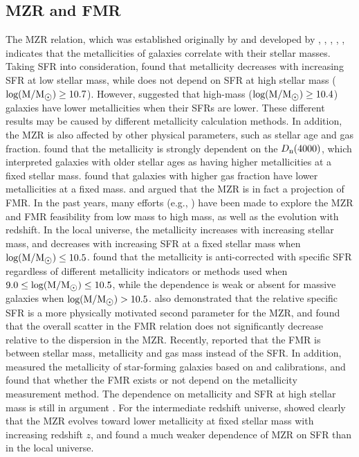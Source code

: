 \documentclass[usenatbib]{raa}
\begin{document}
\subsection{MZR and FMR}
The MZR relation, which was established originally by \cite{1979AA....80..155L} and developed by
\cite{1987ApJ...317...82G}, \cite{1989ApJ...347..875S}, 
\cite{1991ApJ...379..157B}, \cite{1994ApJ...420...87Z}, 
\cite{2004ApJ...613..898T},
 indicates that the metallicities of galaxies correlate with their stellar masses.
Taking SFR into consideration, \cite{2010MNRAS.408.2115M} found that
metallicity decreases with increasing SFR at low stellar mass, while 
does not depend on SFR at high stellar mass ($\rm log(M/M_{\hbox{$\odot$}}) \ge
10.7$). However, \cite{2012MNRAS.422..215Y} suggested that high-mass
($\rm log(M/M_{\hbox{$\odot$}}) \ge 10.4$) galaxies have lower metallicities
when their SFRs are lower. These different results may be caused
by different metallicity calculation methods. In addition, the MZR is also affected by other
physical parameters, such as stellar age and gas fraction. 
\cite{2015MNRAS.446.1449L} found that
the metallicity is strongly dependent on the $D\rm_{n}(4000)$,  which interpreted galaxies with older stellar ages as having
higher metallicities at a fixed stellar mass. \cite{2013AA...550A.115H} found that galaxies with higher
gas fraction have lower metallicities at a fixed mass.
\cite{2010AA...521L..53L} and \cite{2010MNRAS.408.2115M} argued that the MZR 
is in fact a projection
of FMR. In the past years, many efforts (e.g., \cite{2010MNRAS.408.2115M,
 2012ApJ...754...98B, 2013ApJ...765..140A, 2014ApJ...797..126S, 
2015ApJ...805...45L, 2016ApJ...828...67L}) 
have been made to explore the MZR and FMR feasibility from low mass 
to high mass, as well as the evolution with redshift.
In the local universe, the metallicity increases with increasing stellar mass,
and decreases with increasing SFR at a fixed stellar mass when
$\rm log(M/M_{\hbox{$\odot$}}) \le 10.5$. \cite{2014ApJ...797..126S} found that
the metallicity is anti-corrected with specific SFR regardless of different metallicity
indicators or methods used when $\rm 9.0 \le log(M/M_{\hbox{$\odot$}}) \le 10.5$, while the dependence is weak or absent for massive galaxies 
when $\rm log(M/M_{\hbox{$\odot$}}) > 10.5$. \cite{2014ApJ...797..126S} also 
demonstrated that the relative 
specific SFR is a more physically motivated second parameter for the MZR, and found that the overall scatter 
in the FMR relation does not significantly decrease  
relative to the dispersion in the MZR. Recently, 
\cite{2016MNRAS.455.1156B}
reported that the FMR is between stellar mass, metallicity and gas mass
instead of the SFR. In addition, \cite{2016ApJ...823L..24K} measured the 
metallicity of star-forming galaxies based on \cite{2016ApSS.361...61D}
 and \cite{2008AA...488..463M} calibrations, and found that whether the FMR 
exists or not depend on the metallicity measurement method. The dependence on 
metallicity and SFR at high stellar mass is still in argument
\citep{2016ApJ...823L..24K}. 
For the intermediate redshift universe, \cite{2016ApJ...828...67L} showed clearly that the MZR
evolves toward lower metallicity at fixed stellar mass with increasing redshift $z$,
and found a much weaker dependence of MZR on SFR than in the local universe. 
\end{document}
